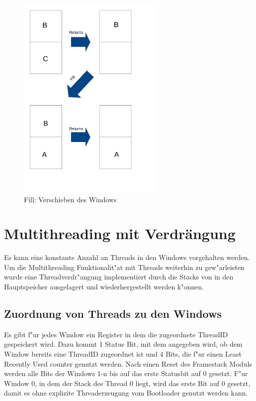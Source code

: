 \begin{figure}
	\centering
	\includegraphics[height = 10cm]{PS_RS_graphics/fill.pdf}
	\caption{Fill: Verschieben des Windows}
\end{figure}
\section{Multithreading mit Verdr\"angung}
Es kann eine konstante Anzahl an Threads in den Windows vorgehalten werden. Um die Multithreading Funktionalit"at mit Threads weiterhin zu gew"arleisten wurde eine Threadverdr"angung implementiert durch die Stacks von in den Hauptspeicher ausgelagert und wiederhergestellt werden k"onnen.

\subsection{Zuordnung von Threads zu den Windows}
Es gibt f"ur jedes Window ein Register in dem die zugeordnete ThreadID gespeichert wird. Dazu kommt 1 Status Bit, mit dem angegeben wird, ob dem Window bereits eine ThreadID zugeordnet ist und 4 Bits, die f"ur einen Least Recently Used counter genutzt werden. Nach einen Reset des Framestack Moduls werden alle Bits der Windows 1-n bis auf das erste Statusbit auf 0 gesetzt. F"ur Window 0, in dem der Stack des Thread 0 liegt, wird das erste Bit auf 0 gesetzt, damit es ohne explizite Threaderzeugung vom Bootloader genutzt werden kann.  


